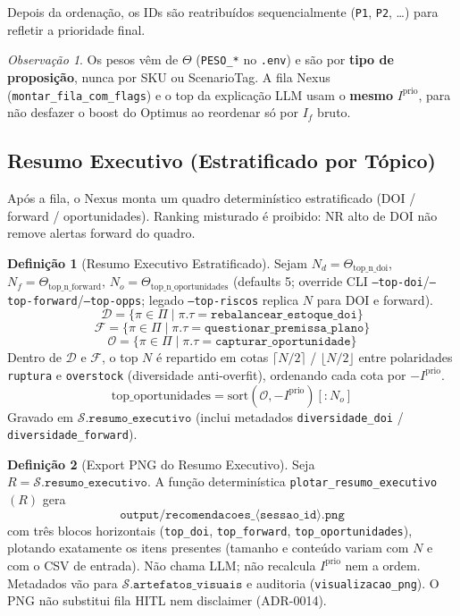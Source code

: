 \documentclass[a4paper, 12pt]{report}
\theoremstyle{definition}
\newtheorem{definicao}{Defini\c{c}\~ao}[chapter]
\theoremstyle{remark}
\newtheorem{observacao}{Observa\c{c}\~ao}[chapter]
\newcommand{\state}{\mathcal{S}}
\begin{document}
Depois da ordena\c{c}\~ao, os IDs s\~ao reatribu\'idos sequencialmente
(\texttt{P1}, \texttt{P2}, \ldots) para refletir a prioridade final.

\begin{observacao}
  Os pesos v\^em de $\Theta$ (\texttt{PESO\_*} no \texttt{.env}) e s\~ao
  por \textbf{tipo de proposi\c{c}\~ao}, nunca por SKU ou ScenarioTag.
  A fila Nexus (\texttt{montar\_fila\_com\_flags}) e o top da
  explica\c{c}\~ao LLM usam o \textbf{mesmo} $I^{\text{prio}}$, para
  n\~ao desfazer o boost do Optimus ao reordenar s\'o por $I_f$ bruto.
\end{observacao}

\subsection{Resumo Executivo (Estratificado por T\'opico)}

Ap\'os a fila, o Nexus monta um quadro determin\'istico estratificado
(DOI / forward / oportunidades). Ranking misturado \'e proibido:
NR alto de DOI n\~ao remove alertas forward do quadro.

\begin{definicao}[Resumo Executivo Estratificado]
  Sejam
  $N_d = \Theta_{\text{top\_n\_doi}}$,
  $N_f = \Theta_{\text{top\_n\_forward}}$,
  $N_o = \Theta_{\text{top\_n\_oportunidades}}$
  (defaults 5; override CLI
  \texttt{--top-doi}/\texttt{--top-forward}/\texttt{--top-opps};
  legado \texttt{--top-riscos} replica $N$ para DOI e forward).
  \[
    \mathcal{D} = \{\pi \in \Pi \mid \pi.\tau =
      \texttt{rebalancear\_estoque\_doi}\}
  \]
  \[
    \mathcal{F} = \{\pi \in \Pi \mid \pi.\tau =
      \texttt{questionar\_premissa\_plano}\}
  \]
  \[
    \mathcal{O} = \{\pi \in \Pi \mid \pi.\tau =
      \texttt{capturar\_oportunidade}\}
  \]
  Dentro de $\mathcal{D}$ e $\mathcal{F}$, o top $N$ \'e repartido em
  cotas $\lceil N/2\rceil$ / $\lfloor N/2\rfloor$ entre polaridades
  \texttt{ruptura} e \texttt{overstock} (diversidade anti-overfit),
  ordenando cada cota por $-I^{\text{prio}}$.
  \[
    \text{top\_oportunidades} =
      \text{sort}(\mathcal{O}, -I^{\text{prio}})[:N_o]
  \]
  Gravado em $\state.\texttt{resumo\_executivo}$ (inclui metadados
  \texttt{diversidade\_doi} / \texttt{diversidade\_forward}).
\end{definicao}

\begin{definicao}[Export PNG do Resumo Executivo]
  Seja $R = \state.\texttt{resumo\_executivo}$. A fun\c{c}\~ao
  determin\'istica \texttt{plotar\_resumo\_executivo}$(R)$ gera
  \[
    \texttt{output/recomendacoes\_}\langle\texttt{sessao\_id}\rangle\texttt{.png}
  \]
  com tr\^es blocos horizontais (\texttt{top\_doi}, \texttt{top\_forward},
  \texttt{top\_oportunidades}), plotando exatamente os itens presentes
  (tamanho e conte\'udo variam com $N$ e com o CSV de entrada).
  N\~ao chama LLM; n\~ao recalcula $I^{\text{prio}}$ nem a ordem.
  Metadados v\~ao para $\state.\texttt{artefatos\_visuais}$ e auditoria
  (\texttt{visualizacao\_png}). O PNG n\~ao substitui fila HITL nem
  disclaimer (ADR-0014).
\end{definicao}
\end{document}
